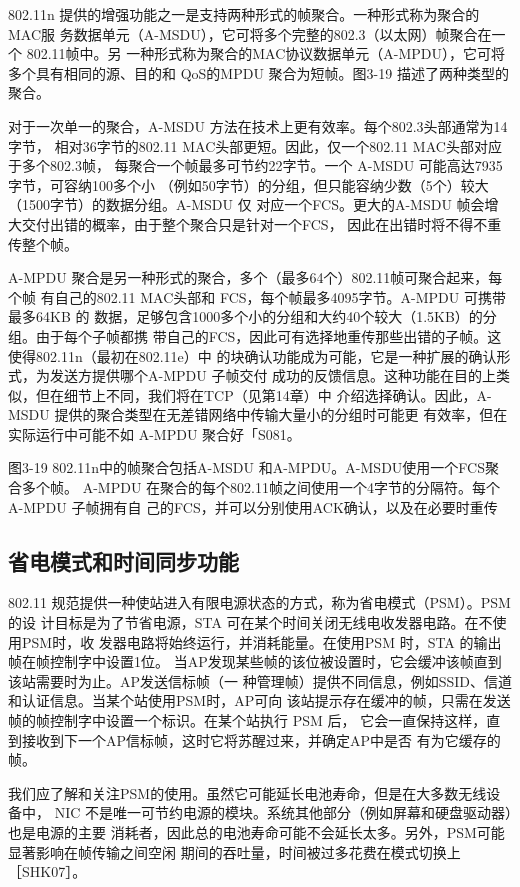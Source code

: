 802.11n 提供的增强功能之一是支持两种形式的帧聚合。一种形式称为聚合的MAC服
务数据单元（A-MSDU），它可将多个完整的802.3（以太网）帧聚合在一个 802.11帧中。另
一种形式称为聚合的MAC协议数据单元（A-MPDU），它可将多个具有相同的源、目的和
QoS的MPDU 聚合为短帧。图3-19 描述了两种类型的聚合。

对于一次单一的聚合，A-MSDU 方法在技术上更有效率。每个802.3头部通常为14字节，
相对36字节的802.11 MAC头部更短。因此，仅一个802.11 MAC头部对应于多个802.3帧，
每聚合一个帧最多可节约22字节。一个 A-MSDU 可能高达7935字节，可容纳100多个小
（例如50字节）的分组，但只能容纳少数（5个）较大（1500字节）的数据分组。A-MSDU 仅
对应一个FCS。更大的A-MSDU 帧会增大交付出错的概率，由于整个聚合只是针对一个FCS，
因此在出错时将不得不重传整个帧。

A-MPDU 聚合是另一种形式的聚合，多个（最多64个）802.11帧可聚合起来，每个帧
有自己的802.11 MAC头部和 FCS，每个帧最多4095字节。A-MPDU 可携带最多64KB 的
数据，足够包含1000多个小的分组和大约40个较大（1.5KB）的分组。由于每个子帧都携
带自己的FCS，因此可有选择地重传那些出错的子帧。这使得802.11n（最初在802.11e）中
的块确认功能成为可能，它是一种扩展的确认形式，为发送方提供哪个A-MPDU 子帧交付
成功的反馈信息。这种功能在目的上类似，但在细节上不同，我们将在TCP（见第14章）中
介绍选择确认。因此，A-MSDU 提供的聚合类型在无差错网络中传输大量小的分组时可能更
有效率，但在实际运行中可能不如 A-MPDU 聚合好「S081。

图3-19
802.11n中的帧聚合包括A-MSDU 和A-MPDU。A-MSDU使用一个FCS聚合多个帧。
A-MPDU 在聚合的每个802.11帧之间使用一个4字节的分隔符。每个A-MPDU 子帧拥有自
己的FCS，并可以分别使用ACK确认，以及在必要时重传

\subsection{省电模式和时间同步功能}

802.11 规范提供一种使站进入有限电源状态的方式，称为省电模式（PSM）。PSM的设
计目标是为了节省电源，STA 可在某个时间关闭无线电收发器电路。在不使用PSM时，收
发器电路将始终运行，并消耗能量。在使用PSM 时，STA 的输出帧在帧控制字中设置1位。
当AP发现某些帧的该位被设置时，它会缓冲该帧直到该站需要时为止。AP发送信标帧（一
种管理帧）提供不同信息，例如SSID、信道和认证信息。当某个站使用PSM时，AP可向
该站提示存在缓冲的帧，只需在发送帧的帧控制字中设置一个标识。在某个站执行 PSM 后，
它会一直保持这样，直到接收到下一个AP信标帧，这时它将苏醒过来，并确定AP中是否
有为它缓存的帧。

我们应了解和关注PSM的使用。虽然它可能延长电池寿命，但是在大多数无线设备中，
NIC 不是唯一可节约电源的模块。系统其他部分（例如屏幕和硬盘驱动器）也是电源的主要
消耗者，因此总的电池寿命可能不会延长太多。另外，PSM可能显著影响在帧传输之间空闲
期间的吞吐量，时间被过多花费在模式切换上［SHK07］。

